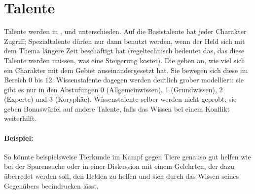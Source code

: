 \EN




\section{Talente}
  Talente werden in ,  und  unterschieden. Auf die Basistalente hat jeder Charakter Zugriff; Spezialtalente dürfen nur dann benutzt werden, wenn der Held sich mit dem Thema längere Zeit beschäftigt hat (regeltechnisch bedeutet das, das diese Talente  werden müssen, was eine Steigerung kostet). Die  geben an, wie viel sich ein Charakter mit dem Gebiet auseinandergesetzt hat. Sie bewegen sich diese im Bereich $0$ bis $12$. Wissenstalente dagegen werden deutlich grober modelliert: sie gibt es nur in den Abstufungen 0 (Allgemeinwissen), 1 (Grundwissen), 2 (Experte) und 3 (Koryphäe). Wissenstalente selber werden nicht geprobt; sie geben Bonuswürfel auf andere Talente, falls das Wissen bei einem Konflikt weiterhilft.

\begin{beispiel}
   \paragraph{Beispiel:}
So könnte beispielsweise Tierkunde im Kampf gegen Tiere genauso gut helfen wie bei  der Spurensuche oder in einer Diskussion mit einem Gelehrten, der dazu überredet werden soll, den Helden zu helfen und sich durch das Wissen seines Gegenübers beeindrucken lässt.
\end{beispiel}

